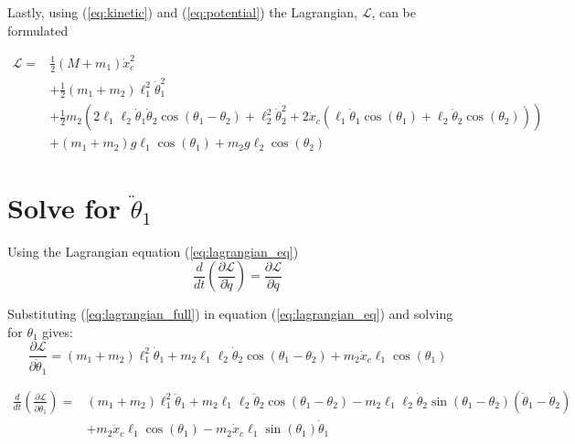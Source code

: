 \documentclass[10pt]{article}
\begin{document}
    Lastly, using (\ref{eq:kinetic}) and (\ref{eq:potential}) the 
    Lagrangian, $\mathcal{L}$, can be formulated
    
    \begin{equation} \label{eq:lagrangian_full}
        \begin{aligned}
            \mathcal{L} = & \frac{1}{2}(M + m_1) \dot x_c^2 \\
            & + \frac{1}{2}(m_1 + m_2)\ell_1^2\dot\theta_1^2 \\
            & + \frac{1}{2} m_2 \left(2\ell_1\ell_2 \dot\theta_1 \dot\theta_2 \cos(\theta_1 - \theta_2) + \ell_2^2\dot\theta_2^2 + 2\dot x_c(\ell_1 \dot \theta_1 \cos(\theta_1) + \ell_2 \dot \theta_2 \cos(\theta_2))\right) \\
            & + (m_1 + m_2)g\ell_1\cos(\theta_1) + m_2g\ell_2\cos(\theta_2)
        \end{aligned}
    \end{equation}
    

    \pagebreak
    \section{Solve for $\ddot \theta_1$}

    Using the Lagrangian equation (\ref{eq:lagrangian_eq})
    \begin{equation} \label{eq:lagrangian_eq}
        \frac{d}{dt} \left(\frac{\partial \mathcal{L}}{\partial \dot q} \right) = 
        \frac{\partial \mathcal{L}}{\partial q}
    \end{equation}

    Substituting (\ref{eq:lagrangian_full}) in equation (\ref{eq:lagrangian_eq}) and solving for $\theta_1$ gives:
    \begin{equation} \label{eq: lagrange Step1}
        \frac{\partial \mathcal{L}}{\partial \dot\theta_1} = 
         (m_1 + m_2)\ell_1^2\dot\theta_1 + m_2\ell_1\ell_2\dot\theta_2\cos(\theta_1 - \theta_2) + m_2\dot x_c\ell_1\cos(\theta_1)
    \end{equation}

    \begin{equation} \label{eq: lagrange Step2}
        \begin{aligned}
        \frac{d}{dt} \left(\frac{\partial \mathcal{L}}{\partial \dot\theta_1}\right) =& 
         (m_1 + m_2)\ell_1^2\ddot\theta_1   +   m_2\ell_1\ell_2\ddot\theta_2\cos(\theta_1 - \theta_2)  -m_2\ell_1\ell_2\dot\theta_2\sin(\theta_1-\theta_2)(\dot\theta_1 - \dot\theta_2) \\
           & +   m_2\ddot x_c\ell_1\cos(\theta_1) - m_2 \dot x_c\ell_1\sin(\theta_1)\dot\theta_1
        \end{aligned}
    \end{equation}
\end{document}
